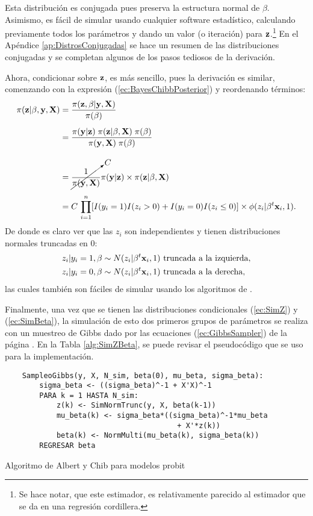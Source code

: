 \documentclass[../Main/Main.tex]{subfiles}
\begin{document}
Esta distribución es conjugada pues preserva la estructura normal de $\beta$. Asimismo, es fácil de simular usando cualquier software estadístico, calculando previamente todos los parámetros y dando un valor (o iteración) para $\mathbf{z}$.\footnote{Se hace notar, que este estimador, es relativamente parecido al estimador que se da en una regresión cordillera.} En el Apéndice \ref{ap:DistrosConjugadas} se hace un resumen de las distribuciones conjugadas y se completan algunos de los pasos tediosos de la derivación. 

Ahora, condicionar sobre $\mathbf{z}$, es más sencillo, pues la derivación es similar, comenzando con la expresión (\ref{ec:BayesChibbPosterior}) y reordenando términos:
\begin{align}
	\pi(\mathbf{z}|\beta,\mathbf{y},\mathbf{X})
	& = \dfrac{\pi(\mathbf{z}, \beta| \mathbf{y}, \mathbf{X})}{\pi(\beta)} \nonumber \\[5pt]
	& = \dfrac{\pi(\mathbf{y} | \mathbf{z})\;\pi(\mathbf{z}|\beta,\mathbf{X}) \; \pi(\beta)}			{\pi(\mathbf{y}, \mathbf{X}) \; \pi(\beta)} \nonumber \\[10pt]
	& = \cancelto{C}{\dfrac{1}{\pi(\mathbf{y}, \mathbf{X})}}\pi(\mathbf{y} | \mathbf{z}) \times \pi(\mathbf{z}|\beta,\mathbf{X}) \nonumber \\[5pt]
	& = C \, \prod_{i = 1}^n[I(y_i = 1)I(z_i > 0) + I(y_i = 0)I(z_i \leq 0)] \times \phi(z_i|\beta^t\mathbf{x}_i,1). \label{ec:BayesChibbZCond}
\end{align}
De donde es claro ver que las $z_i$ son independientes y tienen distribuciones normales truncadas en $0$:
\begin{align}
	z_i|y_i = 1,\beta &\sim N(z_i|\beta^t\mathbf{x}_i,1) \text{ truncada a la izquierda}, \label{ec:SimZ}\\
	z_i|y_i = 0,\beta &\sim N(z_i|\beta^t\mathbf{x}_i,1) \text{ truncada a la derecha}, \nonumber
\end{align}
las cuales también son fáciles de simular usando los algoritmos de \citet{devroye1986non}.

Finalmente, una vez que se tienen las distribuciones condicionales (\ref{ec:SimZ}) y (\ref{ec:SimBeta}), la simulación de esto dos primeros grupos de parámetros se realiza con un muestreo de Gibbs dado por las ecuaciones (\ref{ec:GibbsSampler}) de la página \pageref{ec:GibbsSampler}. En la Tabla \ref{alg:SimZBeta}, se puede revisar el pseudocódigo que se uso para la implementación.\\

\begin{table}[h]
\makebox[\linewidth]{\rule{\textwidth}{0.4pt}}
\begin{verbatim} 
    SampleoGibbs(y, X, N_sim, beta(0), mu_beta, sigma_beta):
        sigma_beta <- ((sigma_beta)^-1 + X'X)^-1
        PARA k = 1 HASTA N_sim:
            z(k) <- SimNormTrunc(y, X, beta(k-1))
            mu_beta(k) <- sigma_beta*((sigma_beta)^-1*mu_beta
            							+ X'*z(k))
            beta(k) <- NormMulti(mu_beta(k), sigma_beta(k)) 
        REGRESAR beta
\end{verbatim}
\makebox[\linewidth]{\rule{\textwidth}{0.4pt}}
\label{alg:SimZBeta}
\caption{Algoritmo de Albert y Chib para modelos probit}
\end{table}
\end{document}
